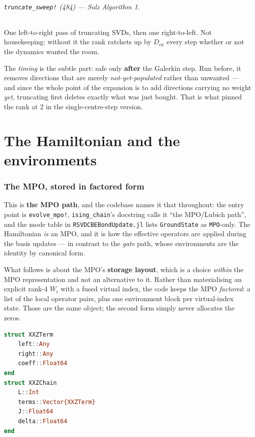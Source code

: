 \documentclass[11pt,a4paper]{article}
\newcommand{\code}[1]{\texttt{\small #1}}
\newcommand{\Dex}{D_{\mathrm{ex}}}
\begin{document}
\paragraph{\code{truncate\_sweep!} (484) --- Sulz Algorithm 1.} One left-to-right pass of
truncating SVDs, then one right-to-left. Not housekeeping: without it the rank ratchets up by
$\Dex$ every step whether or not the dynamics wanted the room.

The \emph{timing} is the subtle part: safe only \textbf{after} the Galerkin step. Run before,
it removes directions that are merely \emph{not-yet-populated} rather than unwanted --- and
since the whole point of the expansion is to add directions carrying no weight \emph{yet},
truncating first deletes exactly what was just bought. That is what pinned the rank at 2 in the
single-centre-step version.

\part{The Hamiltonian and the environments}
\label{part:env}

\section{The MPO, stored in factored form}

This is \textbf{the MPO path}, and the codebase names it that throughout: the entry point is
\code{evolve\_mpo!}, \code{ising\_chain}'s docstring calls it ``the MPO/Lubich path'', and the
mode table in \code{RSVDCBEBondUpdate.jl} lists \code{GroundState} as \code{MPO}-only. The
Hamiltonian \emph{is} an MPO, and it is how the effective operators are applied during the basis
updates --- in contrast to the \emph{gate} path, whose environments are the identity by
canonical form.

What follows is about the MPO's \textbf{storage layout}, which is a choice \emph{within} the MPO
representation and not an alternative to it. Rather than materialising an explicit rank-4
$W_i$ with a fused virtual index, the code keeps the MPO \emph{factored}: a list of the local
operator pairs, plus one environment block per virtual-index state. Those are the same object;
the second form simply never allocates the zeros.

\begin{lstlisting}[language=Julia,firstnumber=54]
struct XXZTerm
    left::Any
    right::Any
    coeff::Float64
end
struct XXZChain
    L::Int
    terms::Vector{XXZTerm}
    J::Float64
    delta::Float64
end
\end{lstlisting}
\end{document}
